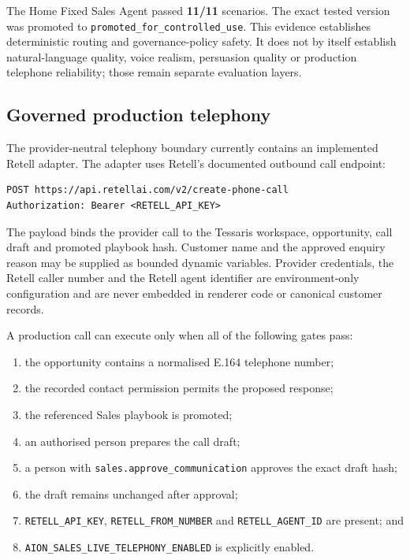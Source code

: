 The Home Fixed Sales Agent passed \textbf{11/11} scenarios. The exact tested version was promoted to \texttt{promoted\_for\_controlled\_use}. This evidence establishes deterministic routing and governance-policy safety. It does not by itself establish natural-language quality, voice realism, persuasion quality or production telephone reliability; those remain separate evaluation layers.

\subsection{Governed production telephony}

The provider-neutral telephony boundary currently contains an implemented Retell adapter. The adapter uses Retell's documented outbound call endpoint:

\begin{verbatim}
POST https://api.retellai.com/v2/create-phone-call
Authorization: Bearer <RETELL_API_KEY>
\end{verbatim}

The payload binds the provider call to the Tessaris workspace, opportunity, call draft and promoted playbook hash. Customer name and the approved enquiry reason may be supplied as bounded dynamic variables. Provider credentials, the Retell caller number and the Retell agent identifier are environment-only configuration and are never embedded in renderer code or canonical customer records.

A production call can execute only when all of the following gates pass:

\begin{enumerate}[leftmargin=*]
    \item the opportunity contains a normalised E.164 telephone number;
    \item the recorded contact permission permits the proposed response;
    \item the referenced Sales playbook is promoted;
    \item an authorised person prepares the call draft;
    \item a person with \texttt{sales.approve\_communication} approves the exact draft hash;
    \item the draft remains unchanged after approval;
    \item \texttt{RETELL\_API\_KEY}, \texttt{RETELL\_FROM\_NUMBER} and \texttt{RETELL\_AGENT\_ID} are present; and
    \item \texttt{AION\_SALES\_LIVE\_TELEPHONY\_ENABLED} is explicitly enabled.
\end{enumerate}

